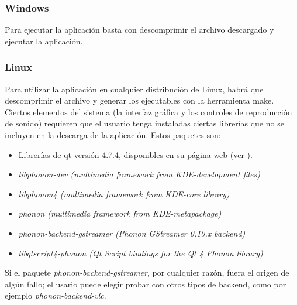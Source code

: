 		\subsubsection{Windows}
		
		Para ejecutar la aplicación basta con descomprimir el archivo descargado y ejecutar la aplicación.
		
		\subsubsection{Linux}
		
		Para utilizar la aplicación en cualquier distribución de Linux, habrá que descomprimir el archivo y generar los ejecutables con la herramienta make. Ciertos elementos del sistema (la interfaz gráfica y los controles de reproducción de sonido) requieren que el usuario tenga instaladas ciertas librerías que no se incluyen en la descarga de la aplicación. Estos paquetes son:
		
		\begin{itemize}
			\item Librerías de qt versión 4.7.4, disponibles en su página web (ver \cite{qtlibs}).		
			\item \emph{libphonon-dev (multimedia framework from KDE-development files)} 
			\item \emph{libphonon4 (multimedia framework from KDE-core library)}
			\item \emph{phonon (multimedia framework from KDE-metapackage)}
			\item \emph{phonon-backend-gstreamer (Phonon GStreamer 0.10.x backend)}
			\item \emph{libqtscript4-phonon (Qt Script bindings for the Qt 4 Phonon library)}
			
		\end{itemize}
	
		Si el paquete \emph{phonon-backend-gstreamer}, por cualquier razón, fuera el origen de algún fallo; el usario puede elegir probar con otros tipos de backend, como por ejemplo \emph{phonon-backend-vlc}.